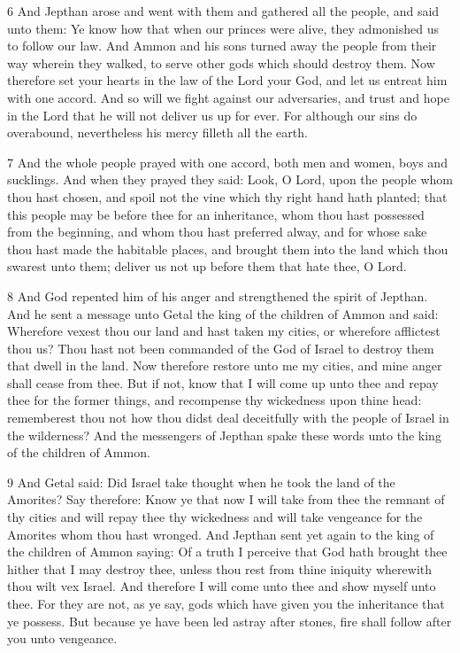 \par 6 And Jepthan arose and went with them and gathered all the people, and said unto them: Ye know how that when our princes were alive, they admonished us to follow our law. And Ammon and his sons turned away the people from their way wherein they walked, to serve other gods which should destroy them. Now therefore set your hearts in the law of the Lord your God, and let us entreat him with one accord. And so will we fight against our adversaries, and trust and hope in the Lord that he will not deliver us up for ever. For although our sins do overabound, nevertheless his mercy filleth all the earth.

\par 7 And the whole people prayed with one accord, both men and women, boys and sucklings. And when they prayed they said: Look, O Lord, upon the people whom thou hast chosen, and spoil not the vine which thy right hand hath planted; that this people may be before thee for an inheritance, whom thou hast possessed from the beginning, and whom thou hast preferred alway, and for whose sake thou hast made the habitable places, and brought them into the land which thou swarest unto them; deliver us not up before them that hate thee, O Lord. 

\par 8 And God repented him of his anger and strengthened the spirit of Jepthan. And he sent a message unto Getal the king of the children of Ammon and said: Wherefore vexest thou our land and hast taken my cities, or wherefore afflictest thou us? Thou hast not been commanded of the God of Israel to destroy them that dwell in the land. Now therefore restore unto me my cities, and mine anger shall cease from thee. But if not, know that I will come up unto thee and repay thee for the former things, and recompense thy wickedness upon thine head: rememberest thou not how thou didst deal deceitfully with the people of Israel in the wilderness? And the messengers of Jepthan spake these words unto the king of the children of Ammon. 

\par 9 And Getal said: Did Israel take thought when he took the land of the Amorites? Say therefore: Know ye that now I will take from thee the remnant of thy cities and will repay thee thy wickedness and will take vengeance for the Amorites whom thou hast wronged. And Jepthan sent yet again to the king of the children of Ammon saying: Of a truth I perceive that God hath brought thee hither that I may destroy thee, unless thou rest from thine iniquity wherewith thou wilt vex Israel. And therefore I will come unto thee and show myself unto thee. For they are not, as ye say, gods which have given you the inheritance that ye possess. But because ye have been led astray after stones, fire shall follow after you unto vengeance.

